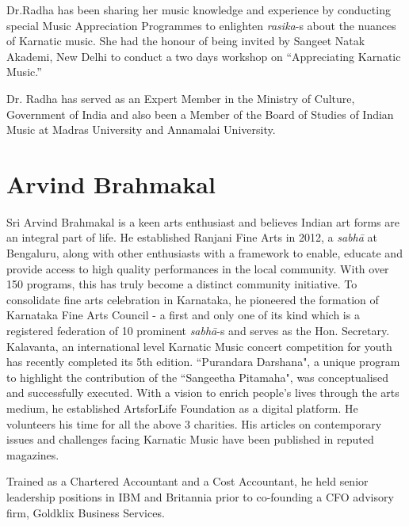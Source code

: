 Dr.Radha has been sharing her music knowledge and experience by conducting special Music Appreciation Programmes to enlighten \textit{rasika}-s about the nuances of Karnatic music. She had the honour of being invited by Sangeet Natak Akademi, New Delhi to conduct a two days workshop on “Appreciating Karnatic Music.”

Dr. Radha has served as an Expert Member in the Ministry of Culture, Government of India and also been a Member of the Board of Studies of Indian Music at Madras University and Annamalai University.

\vspace{-.3cm}

\section*{Arvind Brahmakal}

\vspace{-.2cm}

Sri Arvind Brahmakal is a keen arts enthusiast and believes Indian art forms are an integral part of life. He established Ranjani Fine Arts in 2012, a \textit{sabhā} at Bengaluru, along with other enthusiasts with a framework to enable, educate and provide access to high quality performances in the local community. With over 150 programs, this has truly become a distinct community initiative. To consolidate fine arts celebration in Karnataka, he pioneered the formation of Karnataka Fine Arts Council - a first and only one of its kind which is a registered federation of 10 prominent \textit{sabhā}-s and serves as the Hon. Secretary. Kalavanta, an international level Karnatic Music concert competition for youth has recently completed its 5th edition. ``Purandara Darshana", a unique program to highlight the contribution of the ``Sangeetha Pitamaha", was conceptualised and successfully executed. With a vision to enrich people's lives through the arts medium, he established ArtsforLife Foundation as a digital platform. He volunteers his time for all the above 3 charities. His articles on contemporary issues and challenges facing Karnatic Music have been published in reputed magazines.

\newpage
Trained as a Chartered Accountant and a Cost Accountant, he held senior leadership positions in IBM and Britannia prior to co-founding a CFO advisory firm, Goldklix Business Services.

\vspace{-.3cm}

